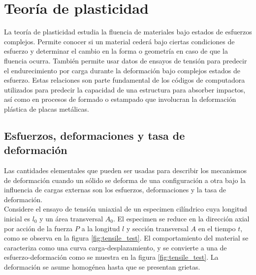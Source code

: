 
\section{Teoría de plasticidad}

La teoría de plasticidad estudia la fluencia de materiales bajo estados de esfuerzos complejos. Permite 
conocer si un material cederá bajo ciertas condiciones de esfuerzo y determinar el cambio en la forma o 
geometría en caso de que la fluencia ocurra. También permite usar datos de ensayos de tensión para predecir 
el endurecimiento por carga durante la deformación bajo complejos estados de esfuerzo. Estas relaciones 
son parte fundamental de los códigos de computadora utilizados para predecir la capacidad de una estructura 
para absorber impactos, así como en procesos de formado o estampado que involucran la deformación plástica de 
placas metálicas. ~\cite{hosford2005}


\subsection{Esfuerzos, deformaciones y tasa de deformación}

Las cantidades elementales que pueden ser usadas para describir los mecanismos de deformación 
cuando un sólido se deforma de una configuración a otra bajo la influencia de cargas externas 
son los esfuerzos, deformaciones y la tasa de deformación. ~\cite{kobayashi1989} \\

Considere el ensayo de tensión uniaxial de un especimen cilíndrico cuya longitud inicial 
es $l_0$ y un área transversal $A_0$. El especimen se reduce en la dirección axial 
por acción de la fuerza $P$ a la longitud $l$ y sección transversal $A$ en el tiempo 
$t$, como se observa en la figura \ref{fig:tensile_test}. El comportamiento del material 
se caracteriza como una curva carga-desplazamiento, y se convierte a una de 
esfuerzo-deformación como se muestra en la figura \ref{fig:tensile_test}. La deformación 
se asume homogénea hasta que se presentan grietas. ~\cite{kobayashi1989} \\

